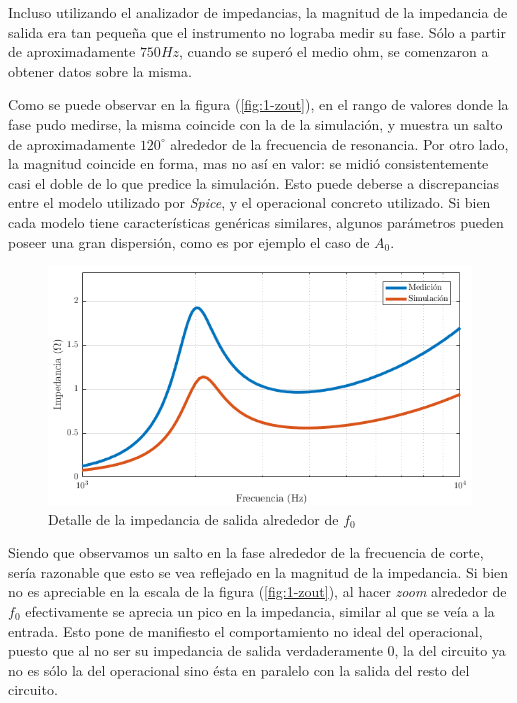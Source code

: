 \documentclass[../../tc_tp3_main.tex]{subfiles}
\begin{document}
Incluso utilizando el analizador de impedancias, la magnitud de la impedancia de salida era tan peque\~na que el instrumento no lograba medir su fase. S\'olo a partir de aproximadamente $750Hz$, cuando se super\'o el medio ohm, se comenzaron a obtener datos sobre la misma. \par

Como se puede observar en la figura (\ref{fig:1-zout}), en el rango de valores donde la fase pudo medirse, la misma coincide con la de la simulaci\'on, y muestra un salto de aproximadamente $120^\circ$ alrededor de la frecuencia de resonancia. Por otro lado, la magnitud coincide en forma, mas no as\'i en valor: se midi\'o consistentemente casi el doble de lo que predice la simulaci\'on. Esto puede deberse a discrepancias entre el modelo utilizado por \textit{Spice}, y el operacional concreto utilizado. Si bien cada modelo tiene caracter\'isticas gen\'ericas similares, algunos par\'ametros pueden poseer una gran dispersi\'on, como es por ejemplo el caso de $A_0$. \par 

\begin{figure}[H]
	\centering
  	\includegraphics[scale = 0.6]{imagenes/tc_tp3_ej1_zout_zoom.png}
  	\caption{Detalle de la impedancia de salida alrededor de $f_0$}
  	\label{fig:1-zout-zoom1}
\end{figure}

Siendo que observamos un salto en la fase alrededor de la frecuencia de corte, ser\'ia razonable que esto se vea reflejado en la magnitud de la impedancia. Si bien no es apreciable en la escala de la figura (\ref{fig:1-zout}), al hacer \textit{zoom} alrededor de $f_0$ efectivamente se aprecia un pico en la impedancia, similar al que se ve\'ia a la entrada. Esto pone de manifiesto el comportamiento no ideal del operacional, puesto que al no ser su impedancia de salida verdaderamente 0, la del circuito ya no es s\'olo la del operacional sino \'esta en paralelo con la salida del resto del circuito. 
\end{document}

